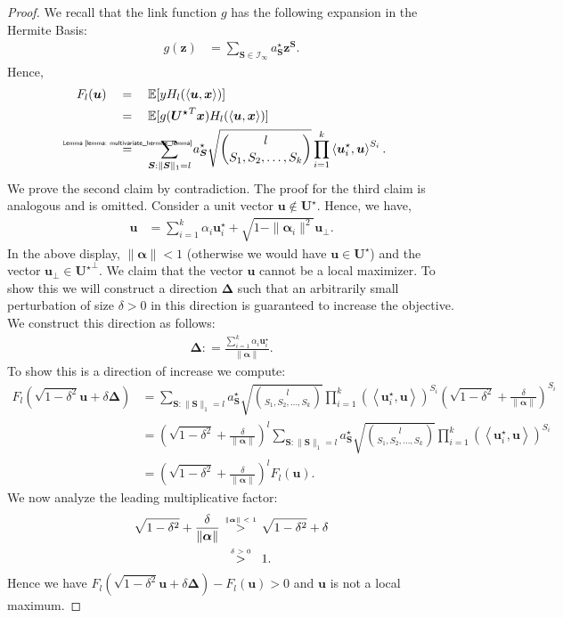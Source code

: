 \documentclass[final,12pt]{colt2018} %
\newcommand{\E}{\mathbb{E}}
\newcommand{\explain}[2]{\mathrel{\overset{\makebox[0pt]{\mbox{\normalfont\tiny\sffamily #1}}}{#2}}}
\renewcommand\v[1]{{\ensuremath{\boldsymbol{#1}}}}
\newcommand\ip[1]{\left\langle #1 \right\rangle}
\begin{document}
\begin{proof}
We recall that the link function $g$ has the following expansion in the Hermite Basis: 
\begin{align*}
    g(\v z) & = \sum_{\v S \in \mathcal{I}_\infty} a_{\v S}^\star \v z^{\v S}.
\end{align*}
Hence, 
\begin{align*}
    F_l(\v u) & \quad = \quad \E[ y H_l(\ip{\v u, \v x})] \\
    & \quad = \quad \E[ g(\v {U^\star}^T \v x)H_l(\ip{\v u, \v x})] \\
    & \quad \explain{Lemma~\ref{lemma: multivariate_hermite_lemma}}{=} \quad \sum_{{\v S}: \|{\v S}\|_1 = l} a_{\v S}^\star \sqrt{\binom{l}{S_1, S_2, \dotsc, S_k}} \prod_{i=1}^k \ip{ \v u^\star_i, \v u}^{S_i}.
\end{align*}
We prove the second claim by contradiction. The proof for the third claim is analogous and is omitted. Consider a unit vector $\v u \not\in \mathcal{\v U}^\star$. Hence, we have, 
\begin{align*}
    \v u & = \sum_{i=1}^k \alpha_i \v u_i^\star + \sqrt{1-\| \v \alpha_i\|^2} \v u_\perp.
\end{align*}
In the above display, $\| \v \alpha \| < 1$ (otherwise we would have $\v u \in \mathcal{\v U}^\star$) and the vector $\v u_\perp \in {\mathcal{\v U}^\star}^\perp$. We claim that the vector $\v u$ cannot be a local maximizer. To show this we will construct a direction $\v \Delta$ such that an arbitrarily small perturbation of size $\delta>0$ in this direction is guaranteed to increase the objective. We construct this direction as follows: 
\begin{align*}
    \v \Delta : = \frac{\sum_{i=1}^k \alpha_i \v u_i^\star}{\|\v \alpha \|}.
\end{align*}
To show this is a direction of increase we compute: 
\begin{align*}
    F_l \left( \sqrt{1-\delta^2} \v u + \delta \v \Delta \right)& = \sum_{\v S: \|\v S\|_1 = l} a_{\v S}^\star \sqrt{\binom{l}{S_1, S_2, \dotsc, S_k}} \prod_{i=1}^k ( \ip{ \v u^\star_i, \v u})^{S_i} \left( \sqrt{1-\delta^2} + \frac{\delta}{\| \v \alpha \|} \right)^{S_i} \\
    & = \left( \sqrt{1-\delta^2} + \frac{\delta}{\| \v \alpha \|} \right)^l \sum_{\v S: \|\v S\|_1 = l} a_{\v S}^\star \sqrt{\binom{l}{S_1, S_2, \dotsc, S_k}} \prod_{i=1}^k ( \ip{ \v u^\star_i, \v u})^{S_i} \\
    & = \left( \sqrt{1-\delta^2} + \frac{\delta}{\| \v \alpha \|} \right)^l F_l(\v u).
\end{align*}
We now analyze the leading multiplicative factor: 
\begin{align*}
    \sqrt{1-\delta^2} + \frac{\delta}{\| \v \alpha \|} & \quad \explain{$\| \v \alpha \|< 1$}{>} \quad \sqrt{1-\delta^2} + \delta \\
    & \quad \explain{$\delta > 0$}{>} \quad 1.
\end{align*}
Hence we have $F_l \left( \sqrt{1-\delta^2} \v u + \delta \v \Delta \right) - F_l(\v u) > 0$ and $\v u$ is not a local maximum. 
\end{proof}
\end{document}
